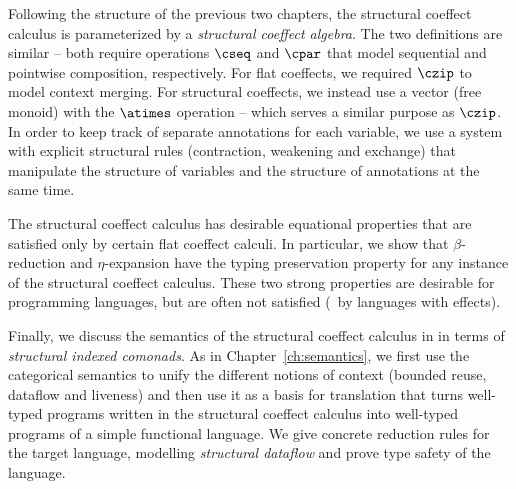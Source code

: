 Following the structure of the previous two chapters, the structural coeffect calculus is parameterized
by a \emph{structural coeffect algebra}. The two definitions are similar -- both require operations
$\cseq$ and $\cpar$ that model sequential and pointwise composition, respectively. For flat
coeffects, we required $\czip$ to model context merging. For structural coeffects, we
instead use a vector (free monoid) with the $\atimes$ operation -- which serves a similar purpose
as $\czip$. In order to keep track of separate annotations for each variable, we use a system with
explicit structural rules (contraction, weakening and exchange) that manipulate the structure
of variables and the structure of annotations at the same time.

The structural coeffect calculus has desirable equational properties that are satisfied only by
certain flat coeffect calculi. In particular, we show that $\beta$-reduction and $\eta$-expansion
have the typing preservation property for any instance of the structural coeffect calculus. These
two strong properties are desirable for programming languages, but are often not satisfied
(\eg~by languages with effects).

Finally, we discuss the semantics of the structural coeffect calculus in in terms of \emph{structural
indexed comonads}. As in Chapter~\ref{ch:semantics}, we first use the categorical semantics
to unify the different notions of context (bounded reuse, dataflow and liveness) and then use
it as a basis for translation that turns well-typed programs written in the structural coeffect
calculus into well-typed programs of a simple functional language. We give concrete reduction
rules for the target language, modelling \emph{structural dataflow} and prove type safety
of the language.

